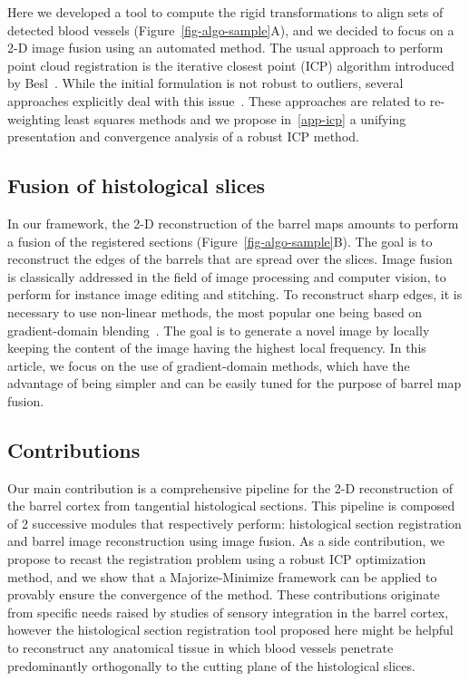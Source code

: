 Here we developed a tool to compute the rigid transformations to align sets of detected blood vessels (Figure~\ref{fig-algo-sample}A), and we decided to focus on a 2-D image fusion using an automated method.
%
The usual approach to perform point cloud registration is the iterative closest point (ICP) algorithm introduced by Besl~\cite{besl_1992}. While the initial formulation is not robust to outliers, several approaches explicitly deal with this issue~\cite{chetverikov_2005,nishino_2002,stewart_2002,kaneko_2003,ma_1999}. These approaches are related to re-weighting least squares methods and we propose in~\ref{app-icp} a unifying presentation and convergence analysis of a robust ICP method. 




\subsection{Fusion of histological slices}

In our framework, the 2-D reconstruction of the barrel maps amounts to perform a fusion of the registered sections (Figure~\ref{fig-algo-sample}B). The goal is to reconstruct the edges of the barrels that are spread over the slices. Image fusion is classically addressed in the field of image processing and computer vision, to perform for instance image editing and stitching. To reconstruct sharp edges, it is necessary to use non-linear methods, the most popular one being based on gradient-domain blending~\cite{perez_2003,raskar_2004}.
%
The goal is to generate a novel image by locally keeping the content of the image having the highest local frequency. In this article, we focus on the use of gradient-domain methods, which have the advantage of being simpler and can be easily tuned for the purpose of barrel map fusion.



\subsection{Contributions}

Our main contribution is a comprehensive pipeline for the 2-D reconstruction of the barrel cortex from tangential  histological sections. 
This pipeline is composed of 2 successive modules that respectively perform: histological section registration and barrel image reconstruction using image fusion. 
%
As a side contribution, we propose to recast the registration problem using a robust ICP optimization method, and we show that a Majorize-Minimize framework can be applied to provably ensure the convergence of the method. 
%
These contributions originate from specific needs raised by studies of sensory integration in the barrel cortex, however the histological section registration tool proposed here might be helpful to reconstruct any anatomical tissue in which blood vessels penetrate predominantly orthogonally to the cutting plane of the histological slices.

